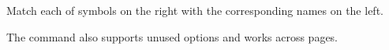 \documentclass{exam}
\begin{document}
\begin{questions}
  \question
  Match each of symbols on the right with the corresponding names on the left.


  The command also supports unused options and works across pages.

\end{questions}
\end{document}
